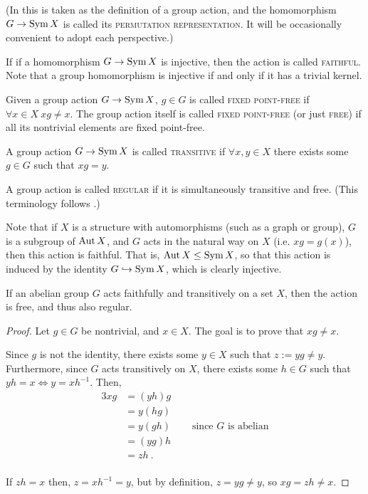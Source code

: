 \documentclass{report}
\begin{document}
    (In \cite{dummit-foote}
    this is taken as the definition of a group action,
    and the homomorphism $G \to \operatorname{Sym} X$ is called its \textsc{permutation
    representation}.  It will be occasionally convenient to adopt each
    perspective.)

    \begin{defn}\label{group-action-types}
      If if a homomorphism $G \to \operatorname{Sym} X$ is injective,
      then the action is called \textsc{faithful}.
      Note that a group homomorphism is injective
      if and only if it has a trivial kernel.

      Given a group action $G \to \operatorname{Sym} X$,
      $g \in G$ is called \textsc{fixed point-free}
      if $\forall x \in X\ xg \neq x$.
      The group action itself is called \textsc{fixed point-free}
      (or just \textsc{free}) if all its nontrivial elements
      are fixed point-free.

      A group action $G \to \operatorname{Sym} X$ is called \textsc{transitive}
      if $\forall x, y \in X$ there exists some $g \in G$
      such that $xg = y$.

      A group action is called \textsc{regular} if it is simultaneously
      transitive and free.  (This terminology follows \cite{godsil}.)
    \end{defn}

    Note that if $X$ is a structure with automorphisms
    (such as a graph or group), $G$ is a subgroup of $\operatorname{Aut} X$,
    and $G$ acts in the natural way on $X$ (i.e. $xg = g(x)$),
    then this action is faithful.
    That is, $\operatorname{Aut} X \leq \operatorname{Sym} X$,
    so that this action is induced by the identity $G \hookrightarrow \operatorname{Sym} X$,
    which is clearly injective.

    \begin{lem}\label{faithful-transitive-abelian}
      If an abelian group $G$ acts faithfully and transitively on a set $X$,
      then the action is free, and thus also regular. \cite[Section 4.1,
      Exercise 3]{dummit-foote}
    \end{lem}

    \begin{proof}
      Let $g \in G$ be nontrivial, and $x \in X$.
      The goal is to prove that $xg \neq x$.

      Since $g$ is not the identity,
      there exists some $y \in X$ such that $z := yg \neq y$.
      Furthermore, since $G$ acts transitively on $X$,
      there exists some $h \in G$ such that $yh = x \iff y = xh^{-1}$.
      Then,
      \begin{alignat*}{3}
        xg &= (yh) g &\\
        &= y (hg) &\\
        &= y (gh) \quad&\text{ since $G$ is abelian}\\
        &= (yg) h &\\
        &= zh \ .&\\
      \end{alignat*}

      If $zh = x$ then, $z = xh^{-1} = y$,
      but by definition, $z = yg \neq y$,
      so $xg = zh \neq x$.
    \end{proof}
\end{document}
